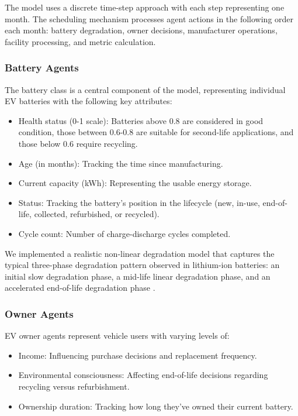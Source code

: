 The model uses a discrete time-step approach with each step representing one month. The scheduling mechanism processes agent actions in the following order each month: battery degradation, owner decisions, manufacturer operations, facility processing, and metric calculation.

\subsubsection{Battery Agents}
The battery class is a central component of the model, representing individual EV batteries with the following key attributes:

\begin{itemize}
  \item Health status (0-1 scale): Batteries above 0.8 are considered in good condition, those between 0.6-0.8 are suitable for second-life applications, and those below 0.6 require recycling.
  \item Age (in months): Tracking the time since manufacturing.
  \item Current capacity (kWh): Representing the usable energy storage.
  \item Status: Tracking the battery's position in the lifecycle (new, in-use, end-of-life, collected, refurbished, or recycled).
  \item Cycle count: Number of charge-discharge cycles completed.
\end{itemize}

We implemented a realistic non-linear degradation model that captures the typical three-phase degradation pattern observed in lithium-ion batteries: an initial slow degradation phase, a mid-life linear degradation phase, and an accelerated end-of-life degradation phase \cite{YOU2024}.

\subsubsection{Owner Agents}
EV owner agents represent vehicle users with varying levels of:

\begin{itemize}
  \item Income: Influencing purchase decisions and replacement frequency.
  \item Environmental consciousness: Affecting end-of-life decisions regarding recycling versus refurbishment.
  \item Ownership duration: Tracking how long they've owned their current battery.
\end{itemize}

